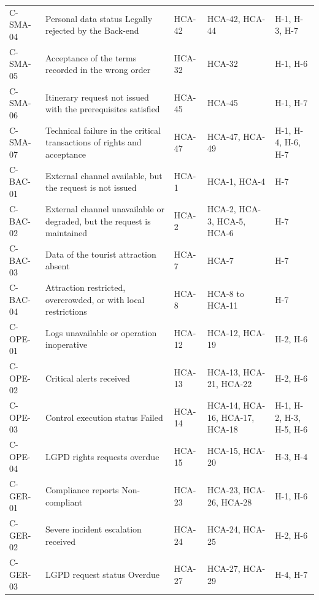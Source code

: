 \begin{longtable}{l p{} l p{} p{}}
        C-SMA-04 & Personal data status Legally rejected by the Back-end & HCA-42 & HCA-42, HCA-44 & H-1, H-3, H-7 \\
        C-SMA-05 & Acceptance of the terms recorded in the wrong order & HCA-32 & HCA-32 & H-1, H-6 \\
        C-SMA-06 & Itinerary request not issued with the prerequisites satisfied & HCA-45 & HCA-45 & H-1, H-7 \\
        C-SMA-07 & Technical failure in the critical transactions of rights and acceptance & HCA-47 & HCA-47, HCA-49 & H-1, H-4, H-6, H-7 \\
        C-BAC-01 & External channel available, but the request is not issued & HCA-1 & HCA-1, HCA-4 & H-7 \\
        C-BAC-02 & External channel unavailable or degraded, but the request is maintained & HCA-2 & HCA-2, HCA-3, HCA-5, HCA-6 & H-7 \\
        C-BAC-03 & Data of the tourist attraction absent & HCA-7 & HCA-7 & H-7 \\
        C-BAC-04 & Attraction restricted, overcrowded, or with local restrictions & HCA-8 & HCA-8 to HCA-11 & H-7 \\
        C-OPE-01 & Logs unavailable or operation inoperative & HCA-12 & HCA-12, HCA-19 & H-2, H-6 \\
        C-OPE-02 & Critical alerts received & HCA-13 & HCA-13, HCA-21, HCA-22 & H-2, H-6 \\
        C-OPE-03 & Control execution status Failed & HCA-14 & HCA-14, HCA-16, HCA-17, HCA-18 & H-1, H-2, H-3, H-5, H-6 \\
        C-OPE-04 & LGPD rights requests overdue & HCA-15 & HCA-15, HCA-20 & H-3, H-4 \\
        C-GER-01 & Compliance reports Non-compliant & HCA-23 & HCA-23, HCA-26, HCA-28 & H-1, H-6 \\
        C-GER-02 & Severe incident escalation received & HCA-24 & HCA-24, HCA-25 & H-2, H-6 \\
        C-GER-03 & LGPD request status Overdue & HCA-27 & HCA-27, HCA-29 & H-4, H-7 \\
\end{longtable}
